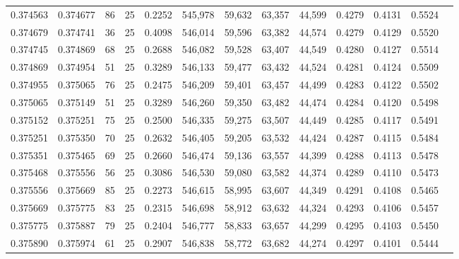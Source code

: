 \begin{tabular}{rrrrrrrrrrrrr}
0.374563 & 0.374677 &    86 &  25 &                                     0.2252 & 545,978 &  59,632 &  63,357 &  44,599 & 0.4279 & 0.4131 & 0.5524 \\
0.374679 & 0.374741 &    36 &  25 &                                     0.4098 & 546,014 &  59,596 &  63,382 &  44,574 & 0.4279 & 0.4129 & 0.5520 \\
0.374745 & 0.374869 &    68 &  25 &                                     0.2688 & 546,082 &  59,528 &  63,407 &  44,549 & 0.4280 & 0.4127 & 0.5514 \\
0.374869 & 0.374954 &    51 &  25 &                                     0.3289 & 546,133 &  59,477 &  63,432 &  44,524 & 0.4281 & 0.4124 & 0.5509 \\
0.374955 & 0.375065 &    76 &  25 &                                     0.2475 & 546,209 &  59,401 &  63,457 &  44,499 & 0.4283 & 0.4122 & 0.5502 \\
0.375065 & 0.375149 &    51 &  25 &                                     0.3289 & 546,260 &  59,350 &  63,482 &  44,474 & 0.4284 & 0.4120 & 0.5498 \\
0.375152 & 0.375251 &    75 &  25 &                                     0.2500 & 546,335 &  59,275 &  63,507 &  44,449 & 0.4285 & 0.4117 & 0.5491 \\
0.375251 & 0.375350 &    70 &  25 &                                     0.2632 & 546,405 &  59,205 &  63,532 &  44,424 & 0.4287 & 0.4115 & 0.5484 \\
0.375351 & 0.375465 &    69 &  25 &                                     0.2660 & 546,474 &  59,136 &  63,557 &  44,399 & 0.4288 & 0.4113 & 0.5478 \\
0.375468 & 0.375556 &    56 &  25 &                                     0.3086 & 546,530 &  59,080 &  63,582 &  44,374 & 0.4289 & 0.4110 & 0.5473 \\
0.375556 & 0.375669 &    85 &  25 &                                     0.2273 & 546,615 &  58,995 &  63,607 &  44,349 & 0.4291 & 0.4108 & 0.5465 \\
0.375669 & 0.375775 &    83 &  25 &                                     0.2315 & 546,698 &  58,912 &  63,632 &  44,324 & 0.4293 & 0.4106 & 0.5457 \\
0.375775 & 0.375887 &    79 &  25 &                                     0.2404 & 546,777 &  58,833 &  63,657 &  44,299 & 0.4295 & 0.4103 & 0.5450 \\
0.375890 & 0.375974 &    61 &  25 &                                     0.2907 & 546,838 &  58,772 &  63,682 &  44,274 & 0.4297 & 0.4101 & 0.5444 \\

\end{tabular}
